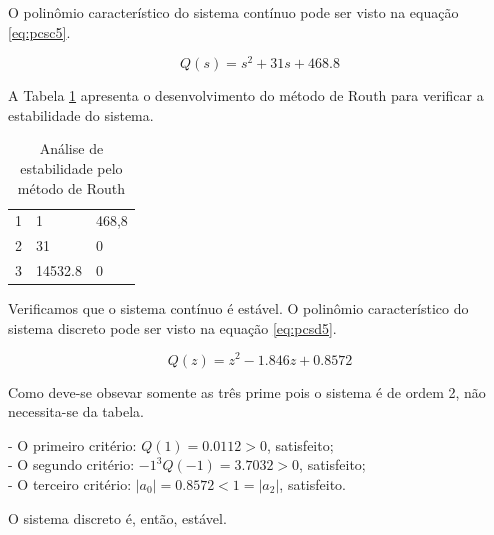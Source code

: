O polinômio característico do sistema contínuo pode ser visto na equação \ref{eq:pcsc5}.

\begin{equation}
    Q(s) = s^2 + 31 s + 468.8
    \label{eq:pcsc5}
\end{equation}

A Tabela \ref{tab:RE5} apresenta o desenvolvimento do método de Routh para verificar a estabilidade do sistema.
\begin{table}[!ht]
    \centering
    \vspace{0.5cm}
    \caption{Análise de estabilidade pelo método de Routh} 
    \begin{tabular}{r|ll}
        1 & 1 & 468{,}8 \\
        2 &  31 & 0 \\
        3 & 14532.8 & 0 \\
    \end{tabular}                
    \label{tab:RE5}
\end{table}

Verificamos que o sistema contínuo é estável.
O polinômio característico do sistema discreto pode ser visto na equação \ref{eq:pcsd5}.

\begin{equation}
    Q(z) =  z^2 - 1.846 z + 0.8572                                                        
    \label{eq:pcsd5}
\end{equation}

Como deve-se obsevar somente as três prime pois o sistema é de ordem 2, não necessita-se da tabela.

- O primeiro critério: $Q(1)= 0.0112 > 0$, satisfeito; \\
- O segundo critério: $-1^3 Q(-1) = 3.7032 > 0$, satisfeito;\\
- O terceiro critério: $|a_0| = 0.8572  < 1 = |a_2|$, satisfeito.

O sistema discreto é, então, estável. 